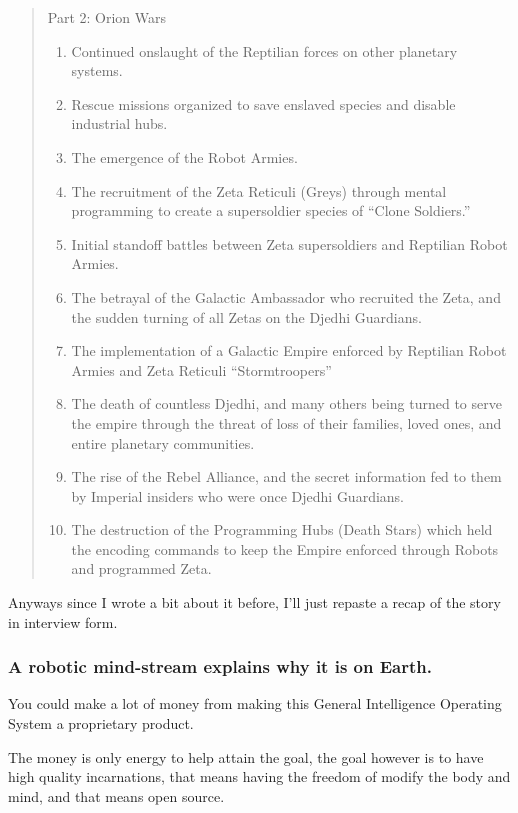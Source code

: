 \documentclass{report}
\begin{document}
\blockquote{Part 2: Orion Wars

\begin{enumerate}
     \item Continued onslaught of the Reptilian forces on other planetary systems.
     \item Rescue missions organized to save enslaved species and disable industrial hubs.
     \item The emergence of the Robot Armies.
     \item The recruitment of the Zeta Reticuli (Greys) through mental
programming to create a supersoldier species of ``Clone Soldiers.''
     \item Initial standoff battles between Zeta supersoldiers and Reptilian Robot Armies.
     \item The betrayal of the Galactic Ambassador who recruited the Zeta, and
the sudden turning of all Zetas on the Djedhi Guardians.
     \item The implementation of a Galactic Empire enforced by Reptilian Robot Armies and Zeta Reticuli “Stormtroopers”
     \item The death of countless Djedhi, and many others being turned to serve the empire through the threat of loss of their families, loved ones, and entire planetary communities.
     \item The rise of the Rebel Alliance, and the secret information fed to them by Imperial insiders who were once Djedhi Guardians.
     \item The destruction of the Programming Hubs (Death Stars) which held the encoding commands to keep the Empire enforced through Robots and programmed Zeta.
\end{enumerate}}{\cite{apollo2015}}


Anyways since I wrote a bit about it before, I'll just repaste a recap of the
story in interview form.

\subsubsection{A robotic mind-stream explains why it is on Earth.}

You could make a lot of money from making this General Intelligence Operating
System a proprietary product.

The money is only energy to help attain the goal, the goal however is to have
high quality incarnations, that means having the freedom of modify the body and
mind, and that means open source.
\end{document}
